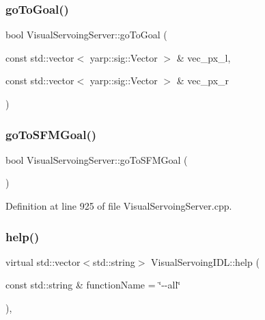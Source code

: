 \subsubsection{\texorpdfstring{go\+To\+Goal()}{goToGoal()}\hspace{0.1cm}{\footnotesize\ttfamily [2/2]}}
{\footnotesize\ttfamily bool Visual\+Servoing\+Server\+::go\+To\+Goal (\begin{DoxyParamCaption}\item[{const std\+::vector$<$ yarp\+::sig\+::\+Vector $>$ \&}]{vec\+\_\+px\+\_\+l,  }\item[{const std\+::vector$<$ yarp\+::sig\+::\+Vector $>$ \&}]{vec\+\_\+px\+\_\+r }\end{DoxyParamCaption})\hspace{0.3cm}{\ttfamily [override]}}

\mbox{\label{classVisualServoingServer_a6d051da5da8c07b0e0879d5af50a248f}} 
\subsubsection{\texorpdfstring{go\+To\+S\+F\+M\+Goal()}{goToSFMGoal()}}
{\footnotesize\ttfamily bool Visual\+Servoing\+Server\+::go\+To\+S\+F\+M\+Goal (\begin{DoxyParamCaption}{ }\end{DoxyParamCaption})\hspace{0.3cm}{\ttfamily [override]}}



Definition at line 925 of file Visual\+Servoing\+Server.\+cpp.

\mbox{\label{classVisualServoingIDL_a99974ef8858179f14e2762c2d7bf4ed5}} 
\subsubsection{\texorpdfstring{help()}{help()}}
{\footnotesize\ttfamily virtual std\+::vector$<$std\+::string$>$ Visual\+Servoing\+I\+D\+L\+::help (\begin{DoxyParamCaption}\item[{const std\+::string \&}]{function\+Name = {\ttfamily \char`\"{}-\/-\/all\char`\"{}} }\end{DoxyParamCaption})\hspace{0.3cm}{\ttfamily [virtual]}, {\ttfamily [inherited]}}

